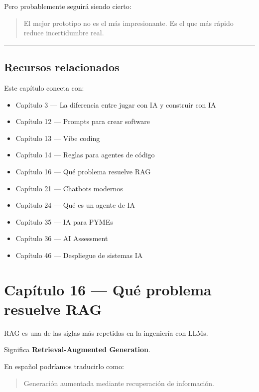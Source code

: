 Pero probablemente seguirá siendo cierto:

\begin{quote}
El mejor prototipo no es el más impresionante. Es el que más rápido
reduce incertidumbre real.
\end{quote}

\begin{center}\rule{0.5\linewidth}{0.5pt}\end{center}

\section{Recursos relacionados}\label{recursos-relacionados-14}

Este capítulo conecta con:

\begin{itemize}
\tightlist
\item
  Capítulo 3 --- La diferencia entre jugar con IA y construir con IA
\item
  Capítulo 12 --- Prompts para crear software
\item
  Capítulo 13 --- Vibe coding
\item
  Capítulo 14 --- Reglas para agentes de código
\item
  Capítulo 16 --- Qué problema resuelve RAG
\item
  Capítulo 21 --- Chatbots modernos
\item
  Capítulo 24 --- Qué es un agente de IA
\item
  Capítulo 35 --- IA para PYMEs
\item
  Capítulo 36 --- AI Assessment
\item
  Capítulo 46 --- Despliegue de sistemas IA
\end{itemize}

\newpage

\chapter{Capítulo 16 --- Qué problema resuelve
RAG}\label{capuxedtulo-16-quuxe9-problema-resuelve-rag}

RAG es una de las siglas más repetidas en la ingeniería con LLMs.

Significa \textbf{Retrieval-Augmented Generation}.

En español podríamos traducirlo como:

\begin{quote}
Generación aumentada mediante recuperación de información.
\end{quote}

